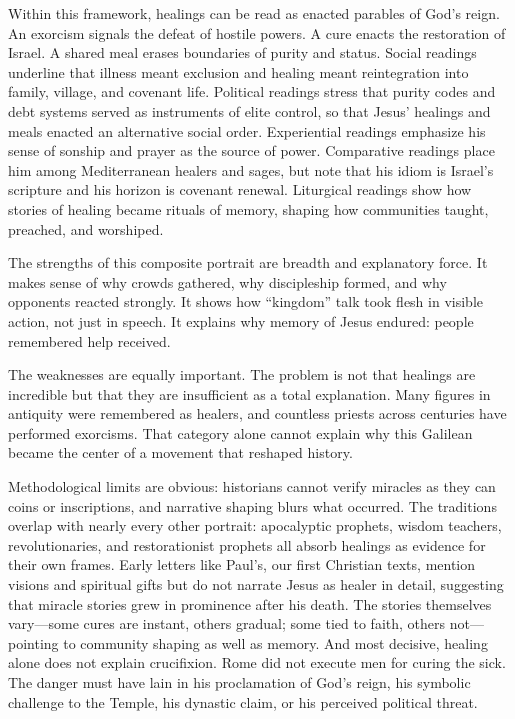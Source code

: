 Within this framework, healings can be read as enacted parables of God’s reign.
An exorcism signals the defeat of hostile powers.
A cure enacts the restoration of Israel.
A shared meal erases boundaries of purity and status.
Social readings underline that illness meant exclusion and healing meant reintegration into family, village, and covenant life.
Political readings stress that purity codes and debt systems served as instruments of elite control, so that Jesus’ healings and meals enacted an alternative social order.
Experiential readings emphasize his sense of sonship and prayer as the source of power.
Comparative readings place him among Mediterranean healers and sages, but note that his idiom is Israel’s scripture and his horizon is covenant renewal.
Liturgical readings show how stories of healing became rituals of memory, shaping how communities taught, preached, and worshiped.

The strengths of this composite portrait are breadth and explanatory force.
It makes sense of why crowds gathered, why discipleship formed, and why opponents reacted strongly.
It shows how “kingdom” talk took flesh in visible action, not just in speech.
It explains why memory of Jesus endured: people remembered help received.

The weaknesses are equally important.
The problem is not that healings are incredible but that they are insufficient as a total explanation.
Many figures in antiquity were remembered as healers, and countless priests across centuries have performed exorcisms.
That category alone cannot explain why this Galilean became the center of a movement that reshaped history.

Methodological limits are obvious: historians cannot verify miracles as they can coins or inscriptions, and narrative shaping blurs what occurred.
The traditions overlap with nearly every other portrait: apocalyptic prophets, wisdom teachers, revolutionaries, and restorationist prophets all absorb healings as evidence for their own frames.
Early letters like Paul’s, our first Christian texts, mention visions and spiritual gifts but do not narrate Jesus as healer in detail, suggesting that miracle stories grew in prominence after his death.
The stories themselves vary—some cures are instant, others gradual; some tied to faith, others not—pointing to community shaping as well as memory.
And most decisive, healing alone does not explain crucifixion.
Rome did not execute men for curing the sick.
The danger must have lain in his proclamation of God’s reign, his symbolic challenge to the Temple, his dynastic claim, or his perceived political threat.

